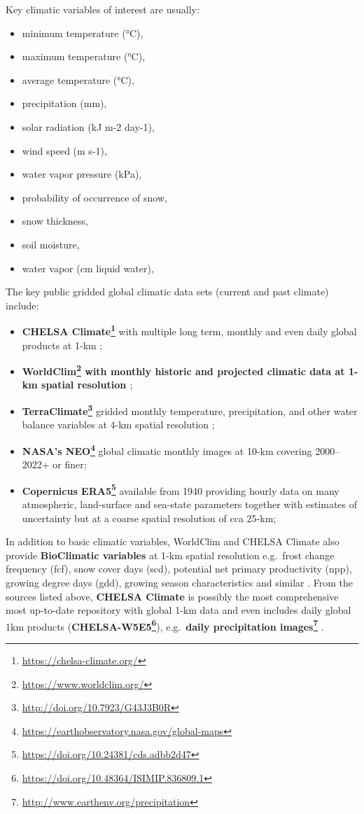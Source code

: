 \documentclass[
  graybox,natbib,nospthms]{svmono}
\providecommand{\tightlist}{%
  \setlength{\itemsep}{0pt}\setlength{\parskip}{0pt}}
\providecommand{\tightlist}{\setlength{\itemsep}{0pt}\setlength{\parskip}{0pt}}
\renewcommand{\href}[2]{#2 (\url{#1})}
\renewcommand{\href}[2]{#2\footnote{\url{#1}}}
\begin{document}
Key climatic variables of interest are usually:

\begin{itemize}
\tightlist
\item
  minimum temperature (°C),
\item
  maximum temperature (°C),
\item
  average temperature (°C),
\item
  precipitation (mm),
\item
  solar radiation (kJ m-2 day-1),
\item
  wind speed (m s-1),
\item
  water vapor pressure (kPa),
\item
  probability of occurrence of snow,
\item
  snow thickness,
\item
  soil moisture,
\item
  water vapor (cm liquid water),
\end{itemize}

The key public gridded global climatic data sets (current and past climate) include:

\begin{itemize}
\tightlist
\item
  \textbf{\href{https://chelsa-climate.org/}{CHELSA Climate}} with multiple long term, monthly and even daily global products at 1-km \citep{karger2019climatologies};
\item
  \textbf{\href{https://www.worldclim.org/}{WorldClim} with monthly historic and projected climatic data at 1-km spatial resolution \citep{Fick2017WorldClim}};
\item
  \textbf{\href{http://doi.org/10.7923/G43J3B0R}{TerraClimate}} gridded monthly temperature, precipitation, and other water balance variables at 4-km spatial resolution \citep{abatzoglou2018terraclimate};
\item
  \textbf{\href{https://earthobservatory.nasa.gov/global-maps}{NASA's NEO}} global climatic monthly images at 10-km covering 2000--2022+ or finer;
\item
  \textbf{\href{https://doi.org/10.24381/cds.adbb2d47}{Copernicus ERA5}} available from 1940 providing hourly data on many atmospheric, land-surface and sea-state parameters together with estimates of uncertainty but at a coarse spatial resolution of cca 25-km;
\end{itemize}

In addition to basic climatic variables, WorldClim and CHELSA Climate also provide \textbf{BioClimatic
variables} at 1-km spatial resolution e.g.~frost change frequency (fcf), snow cover days (scd), potential net primary productivity (npp), growing degree days (gdd), growing season characteristics and similar \citep{brun2022global}.
From the sources listed above, \textbf{CHELSA Climate} is possibly the most comprehensive most
up-to-date repository with global 1-km data and even includes daily global 1km products (\textbf{\href{https://doi.org/10.48364/ISIMIP.836809.1}{CHELSA-W5E5}}),
e.g.~\textbf{\href{http://www.earthenv.org/precipitation}{daily precipitation images}} \citep{karger2021global}.
\end{document}
